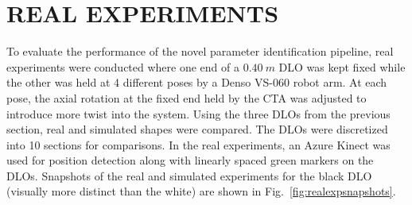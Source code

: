 \documentclass[letterpaper, 10 pt, conference]{ieeeconf}  %
\begin{document}
\section{REAL EXPERIMENTS}
\label{section:realexp}
To evaluate the performance of the novel parameter identification pipeline, real experiments were conducted where one end of a $\SI{0.40}{m}$ DLO was kept fixed while the other was held at 4 different poses by a Denso VS-060 robot arm. At each pose, the axial rotation at the fixed end held by the CTA was adjusted to introduce more twist into the system. Using the three DLOs from the previous section, real and simulated shapes were compared. The DLOs were discretized into 10 sections for comparisons. In the real experiments, an Azure Kinect was used for position detection along with linearly spaced green markers on the DLOs. Snapshots of the real and simulated experiments for the black DLO (visually more distinct than the white) are shown in Fig.~\ref{fig:realexpsnapshots}.
\end{document}
